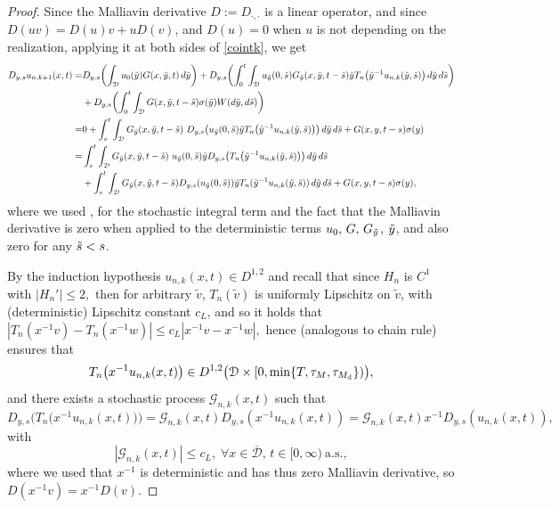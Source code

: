 \documentclass[reqno]{amsart}
\numberwithin{equation}{section}
\newcommand{\cd}{\mathcal{D}}
\newcommand{\ocd}{\overline{\mathcal{D}}}
\newcommand{\cg}{\mathcal{G}}
\begin{document}
\begin{proof}
Since the Malliavin derivative $D:=D_{\cdot,\cdot}$ is a linear
operator, and since $D(uv)=D(u)v+uD(v)$, and $D(u)=0$ when $u$ is
not depending on the realization, applying it at both sides of
\eqref{cointk}, we get
\begin{equation*}
\begin{split}
D_{y,s}u_{n,k+1}(x,t) =& D_{y,s}\biggl{(}\int_{\mathcal{D}}u_{0}(\Tilde{y})G(x,\Tilde{y},t)\,d\Tilde{y}\biggr{)}
+D_{y,s}\biggl{(}\int_{0}^{t}\int_{\mathcal{D}}u_{\Tilde{y}}(0,\Tilde{s})G_{\Tilde{y}}(x,\Tilde{y},t-\Tilde{s})\Tilde{y}T_{n}\bigl{(}\Tilde{y}^{-1}u_{n,k}
(\Tilde{y},\Tilde{s})\bigr{)}\,d\Tilde{y}\,d\Tilde{s}\biggr{)}\\
&+D_{y,s}\biggl{(}\int_{0}^{t}\int_{\cd}G(x,\Tilde{y},t-\Tilde{s})\sigma(\Tilde{y})W(d\Tilde{y},d\Tilde{s})\biggr{)}
\\
=&0+\int_{s}^{t}\int_{\cd}G_{\Tilde{y}}(x,\Tilde{y},t-\Tilde{s})\ D_{y,s}
    \bigl{(}u_{\Tilde{y}}(0,\Tilde{s})\Tilde{y}T_{n}\bigl{(}\Tilde{y}^{-1}u_{n,k}(\Tilde{y},\Tilde{s})\bigr{)}\bigr{)}\,d\Tilde{y}\,d\Tilde{s}+G(x,y,t-s)\sigma(y)\\
   = & \int_{s}^{t}\int_{\cd}G_{\Tilde{y}}(x,\Tilde{y},t-\Tilde{s})\
u_{\Tilde{y}}(0,\Tilde{s})\Tilde{y}D_{y,s}
\bigl{(}T_{n}\bigl{(}\Tilde{y}^{-1}u_{n,k}(\Tilde{y},\Tilde{s})\bigr{)}\bigr{)}\,d\Tilde{y}\,d\Tilde{s}
\\
&+\int_s^t\int_{\cd}G_{\Tilde{y}}(x,\Tilde{y},t-\Tilde{s})
D_{y,s}(u_{\Tilde{y}}(0,\Tilde{s}))\Tilde{y}T_n(\Tilde{y}^{-1}u_{n,k}(\Tilde{y},\Tilde{s}))\,d\Tilde{y}\,d\Tilde{s}+G(x,y,t-s)\sigma(y),
\end{split}
\end{equation*}
where we used \cite[Proposition 1.3.8]{nual}, for the stochastic integral term and the fact that the Malliavin derivative is zero when applied to the deterministic terms $ u_0,\, G,\, G_{\Tilde{y}}$, $\Tilde{y}$, and also zero for any
$\Tilde{s}<s$.

By the induction hypothesis $u_{n,k}(x,t)\in D^{1,2}$ and recall that since $H_n$ is $C^1$ with $ |H_n'|\leq 2, $ then for arbitrary $\tilde{v}$, $T_n(\tilde{v})$ is uniformly Lipschitz on $\tilde{v}$, with (deterministic) Lipschitz constant $c_L$, and so it holds that $|T_n(x^{-1}v)-T_n(x^{-1} w)|\leq c_L|x^{-1}v-x^{-1}w|, $ hence \cite[Proposition 1.2.4]{nual} (analogous to chain rule) ensures that
$$T_n\bigl{(}x^{-1}u_{n,k}(x,t)\bigr{)}\in D^{1,2}\bigl{(}\cd\times[0,\min\{T,\tau_M,\tau_{M_{\rm d}}\})\bigr{)} ,$$
and there exists a stochastic process $\mathcal{G}_{n,k}(x,t)$ such that
$$ D_{y,s}\bigl(T_n\bigl(x^{-1} u_{n,k}(x,t)\bigr)\bigr)=\cg_{n,k}(x,t)D_{y,s}(x^{-1}u_{n,k}(x,t)) = \cg_{n,k}(x,t) x^{-1} D_{y,s}(u_{n,k}(x,t)),$$
with $$|\cg_{n,k}(x,t)|\leq c_L,\; \forall x\in\ocd,\, t\in[0,\infty)\ \text{a.s.},
$$
where we used that $x^{-1}$ is deterministic and has thus zero Malliavin derivative, so $D(x^{-1}v)=x^{-1}D(v)$.


\end{proof}
\end{document}
